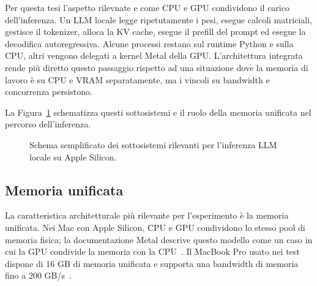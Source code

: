 Per questa tesi l'aspetto rilevnate e come CPU e GPU condividono il carico dell'inferenza. 
Un LLM locale legge ripetutamente i pesi, esegue calcoli matriciali, gestisce il tokenizer,
alloca la KV cache, esegue il prefill del prompt ed esegue la
decodifica autoregressiva. Alcune processi restano sul runtime Python e sulla CPU,
altri vengono delegati a kernel Metal della GPU. L'architettura integrata rende
più diretto questo passaggio rispetto ad una situazione dove la memoria di lavoro è su CPU e VRAM
separatamente, ma i vincoli su bandwidth e concorrenza persistono.

La Figura~\ref{fig:apple_silicon_soc} schematizza questi sottosistemi e il
ruolo della memoria unificata nel percorso dell'inferenza.

\begin{figure}[ht]
  \centering
  \caption{Schema semplificato dei sottosistemi rilevanti per l'inferenza LLM
    locale su Apple Silicon.}
  \label{fig:apple_silicon_soc}
\end{figure}

\subsection{Memoria unificata}
\label{subsec:apple_unified_memory}

La caratteristica architetturale più rilevante per l'esperimento è la memoria
unificata. Nei Mac con Apple Silicon, CPU e GPU condividono lo stesso pool di
memoria fisica; la documentazione Metal descrive questo modello come un caso in
cui la GPU condivide la memoria con la CPU~\cite{apple2026metalunified}. Il
MacBook Pro usato nei test dispone di 16 GB di memoria unificata e
supporta una bandwidth di memoria fino a 200 GB/s~\cite{apple2021m1prospecs}.

